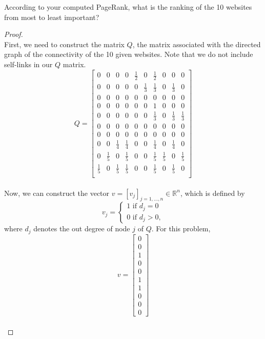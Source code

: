 \documentclass[12pt]{article}
\def\R{\mathbb{R}}
\begin{document}
According to your computed PageRank, what is the ranking of the 10 websites from most to least important?\\

\begin{proof} $\text{ }$\\
First, we need to construct the matrix $Q$, the matrix associated with the directed graph of the connectivity of the 10 given websites.  Note that we do not include self-links in our $Q$ matrix.\\

$$Q = \begin{bmatrix}
		0&0&0&0&\frac{1}{2}&0&\frac{1}{2}&0&0&0 \\
		0&0&0&0&0&\frac{1}{3}&\frac{1}{3}&0&\frac{1}{3}&0 \\
		0&0&0&0&0&0&0&0&0&0 \\
		0&0&0&0&0&0&1&0&0&0 \\
		0&0&0&0&0&0&\frac{1}{3}&0&\frac{1}{3}&\frac{1}{3} \\
		0&0&0&0&0&0&0&0&0&0 \\
		0&0&0&0&0&0&0&0&0&0 \\
		0&0&\frac{1}{4}&\frac{1}{4}&0&0&\frac{1}{4}&0&\frac{1}{4}&0 \\
		0&\frac{1}{5}&0&\frac{1}{5}&0&0&\frac{1}{5}&\frac{1}{5}&0&\frac{1}{5} \\
		\frac{1}{5}&0&\frac{1}{5}&\frac{1}{5}&0&0&\frac{1}{5}&0&\frac{1}{5}&0 \\
		\end{bmatrix} $$\\

Now, we can construct the vector $v = [v_j]_{j=1,\dots,n} \in \R^n$, which is defined by
$$v_j = \begin{cases}
		1 \text{ if } d_j = 0 \\
		0 \text{ if } d_j > 0,
		\end{cases}
$$
where $d_j$ denotes the out degree of node $j$ of $Q$.  For this problem,\\
$$v = \begin{bmatrix}
		0\\
		0\\
		1\\
		0\\
		0\\
		1\\
		1\\
		0\\
		0\\
		0
		\end{bmatrix} $$\\


\end{proof}
\end{document}

